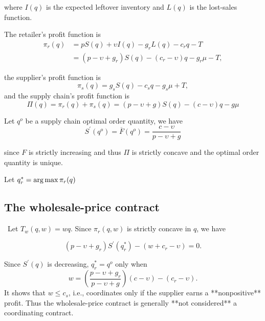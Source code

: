 where $I(q)$ is the expected leftover inventory and $L(q)$ is the lost-sales function.

The retailer's profit function is 
\begin{align}
    \pi_r(q)&=pS(q)+\upsilon I(q)-g_r L(q)-c_r q - T\\
    &=(p-\upsilon+g_r)S(q)-(c_r-\upsilon)q-g_r\mu-T,
\end{align}

the supplier's profit function is 
\begin{equation}
    \pi_s(q)=g_s S(q)-c_s q-g_s\mu + T,
\end{equation}
and the supply chain's profit function is 
\begin{equation}
    \Pi(q)=\pi_r(q)+\pi_s(q)=(p-\upsilon+g)S(q)-(c-\upsilon)q-g\mu
\end{equation}

Let $q^o$ be a supply chain optimal order quantity, we have 
\begin{equation}
    S^\prime(q^o)=\overline F(q^o)=\frac{c-\upsilon}{p-\upsilon+g}
\end{equation}

since $F$ is strictly increasing and thus $\Pi$ is strictly concave and the optimal order quantity is unique.

Let $q_r^*=\operatorname*{arg\,max} \pi_r(q)$

\subsection{The wholesale-price contract}\
Let $T_w(q,w)=w q$. Since $\pi_r(q,w)$ is strictly concave in $q$, we have 

\begin{equation}
    (p-\upsilon+g_r)S^\prime(q_r^*)-(w+c_r-\upsilon)=0.
\end{equation}

Since $S^\prime(q)$ is decreasing, $q_r^*=q^o$ only when
$$
w=(\frac{p-\upsilon+g_r}{p-\upsilon+g})(c-\upsilon)-(c_r-\upsilon).
$$
It shows that $w\leq c_s$, i.e., coordinates only if the supplier earns a **nonpositive** profit. Thus the wholesale-price contract is generally **not considered** a coordinating contract.










   